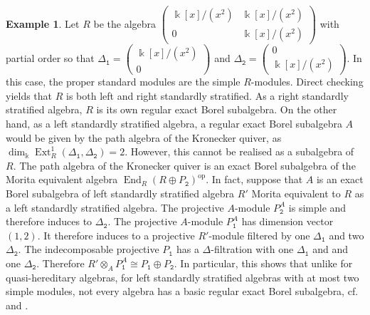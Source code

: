 \documentclass[12pt,a4paper]{amsart}
\theoremstyle{plain}
\theoremstyle{definition}
\newtheorem{ex}[thm]{Example}
\numberwithin{equation}{thm}
\DeclareMathOperator{\Ext}{Ext}
\DeclareMathOperator{\End}{End}
\DeclareMathOperator{\op}{op}
\begin{document}
\begin{ex}
Let $R$ be the algebra $\begin{pmatrix}\Bbbk[x]/(x^2)&\Bbbk[x]/(x^2)\\0&\Bbbk[x]/(x^2)\end{pmatrix}$ with partial order so that $\Delta_\mathtt{1}=\begin{pmatrix}\Bbbk[x]/(x^2)\\0\end{pmatrix}$ and $\Delta_\mathtt{2}=\begin{pmatrix}0\\\Bbbk[x]/(x^2)\end{pmatrix}$. In this case, the proper standard modules are the simple $R$-modules. Direct checking yields that $R$ is both left and right standardly stratified. As a right standardly stratified algebra, $R$ is its own regular exact Borel subalgebra. On the other hand, as a left standardly stratified algebra, a regular exact Borel subalgebra $A$ would be given by the path algebra of the Kronecker quiver, as $\dim_\Bbbk \Ext^1_R(\Delta_\mathtt{1},\Delta_\mathtt{2})=2$. However, this cannot be realised as a subalgebra of $R$. The path algebra of the Kronecker quiver is an exact Borel subalgebra of the Morita equivalent algebra $\End_R(R\oplus P_\mathtt{2})^{\op}$. In fact, suppose that $A$ is an exact Borel subalgebra of left standardly stratified algebra $R'$ Morita equivalent to $R$ as a left standardly stratified algebra. The projective $A$-module $P_\mathtt{2}^A$ is simple and therefore induces to $\Delta_\mathtt{2}$. The projective $A$-module $P_\mathtt{1}^A$ has dimension vector $(1,2)$. It therefore induces to a projective $R'$-module filtered by one $\Delta_\mathtt{1}$ and two $\Delta_\mathtt{2}$. The indecomposable projective $P_\mathtt{1}$ has a $\Delta$-filtration with one $\Delta_\mathtt{1}$ and and one $\Delta_\mathtt{2}$. Therefore $R'\otimes_A P_\mathtt{1}^A\cong P_\mathtt{1} \oplus P_\mathtt{2}$. In particular, this shows that unlike for quasi-hereditary algebras, for left standardly stratified algebras with at most two simple modules, not every algebra has a basic regular exact Borel subalgebra, cf. \cite[Example 4.20]{Con21b} and \cite[Theorem 4.58]{Kul17b}. 
\end{ex}
\end{document}
